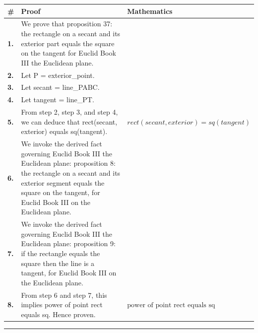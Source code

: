 \documentclass[11pt]{article}
\theoremstyle{definition}
\begin{document}
\begin{tabular}{@{} >{\raggedright\arraybackslash}p{} >{\raggedright\arraybackslash}p{} >{\raggedleft\arraybackslash}p{} @{}}
\textbf{\#} & \textbf{Proof} & \textbf{Mathematics} \\
\midrule
\textbf{1.} & We prove that proposition 37: the rectangle on a secant and its exterior part equals the square on the tangent for Euclid Book III the Euclidean plane. & \\[0.45em]
\textbf{2.} & Let P = exterior\_point. & \\[0.45em]
\textbf{3.} & Let secant = line\_PABC. & \\[0.45em]
\textbf{4.} & Let tangent = line\_PT. & \\[0.45em]
\textbf{5.} & From step 2, step 3, and step 4, we can deduce that rect(secant, exterior) equals sq(tangent). & $\displaystyle rect(secant, exterior) = sq(tangent)$ \\[0.45em]
\textbf{6.} & We invoke the derived fact governing Euclid Book III the Euclidean plane: proposition 8: the rectangle on a secant and its exterior segment equals the square on the tangent, for Euclid Book III on the Euclidean plane. & \\[0.45em]
\textbf{7.} & We invoke the derived fact governing Euclid Book III the Euclidean plane: proposition 9: if the rectangle equals the square then the line is a tangent, for Euclid Book III on the Euclidean plane. & \\[0.45em]
\textbf{8.} & From step 6 and step 7, this implies power of point rect equals sq. Hence proven. & $\displaystyle \text{power of point rect equals sq}$ \\[0.45em]
\bottomrule
\end{tabular}
\label{thm:Geometry-Euclid Book III-proposition_37_the_rectangle_on_a_secant_and_its_exterior_part_equals_the_square_on_the_tangent}
\par\medskip\hrule
\end{document}
